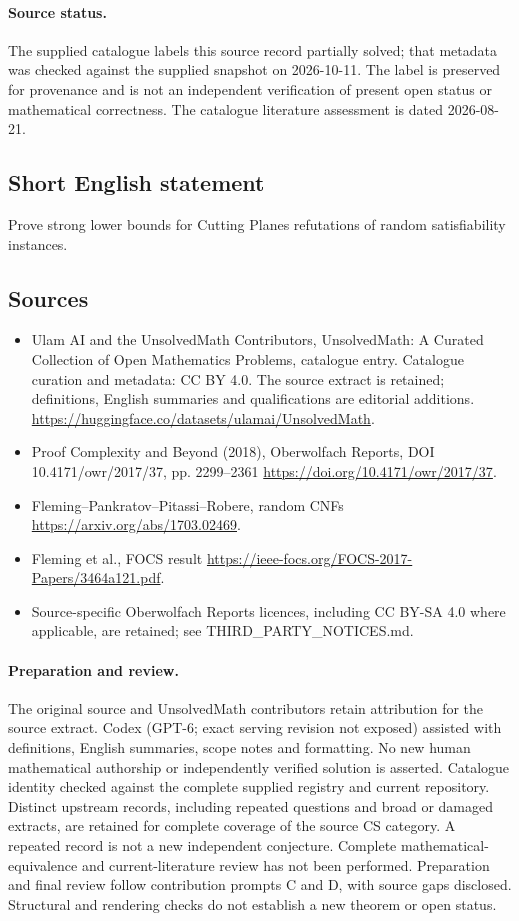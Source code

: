 \documentclass[11pt]{article}
\begin{document}
\paragraph{Source status.}
The supplied catalogue labels this source record partially solved; that metadata was checked against the supplied snapshot on 2026-10-11. The label is preserved for provenance and is not an independent verification of present open status or mathematical correctness. The catalogue literature assessment is dated 2026-08-21.
\subsection{Short English statement}
Prove strong lower bounds for Cutting Planes refutations of random satisfiability instances.
\subsection{Sources}
\begin{itemize}
\item[S1] Ulam AI and the UnsolvedMath Contributors, UnsolvedMath: A Curated Collection of Open Mathematics Problems, catalogue entry. Catalogue curation and metadata: CC BY 4.0. The source extract is retained; definitions, English summaries and qualifications are editorial additions.
\url{https://huggingface.co/datasets/ulamai/UnsolvedMath}.
\item[S2] Proof Complexity and Beyond (2018), Oberwolfach Reports, DOI 10.4171/owr/2017/37, pp. 2299--2361
\url{https://doi.org/10.4171/owr/2017/37}.
\item[S3] Fleming--Pankratov--Pitassi--Robere, random CNFs
\url{https://arxiv.org/abs/1703.02469}.
\item[S4] Fleming et al., FOCS result
\url{https://ieee-focs.org/FOCS-2017-Papers/3464a121.pdf}.
\item Source-specific Oberwolfach Reports licences, including CC BY-SA 4.0 where applicable, are retained; see THIRD\_PARTY\_NOTICES.md.
\end{itemize}
\paragraph{Preparation and review.}
The original source and UnsolvedMath contributors retain attribution for the source extract. Codex (GPT-6; exact serving revision not exposed) assisted with definitions, English summaries, scope notes and formatting. No new human mathematical authorship or independently verified solution is asserted. Catalogue identity checked against the complete supplied registry and current repository. Distinct upstream records, including repeated questions and broad or damaged extracts, are retained for complete coverage of the source CS category. A repeated record is not a new independent conjecture. Complete mathematical-equivalence and current-literature review has not been performed. Preparation and final review follow contribution prompts C and D, with source gaps disclosed. Structural and rendering checks do not establish a new theorem or open status.
\label{end:statement}
\end{document}
